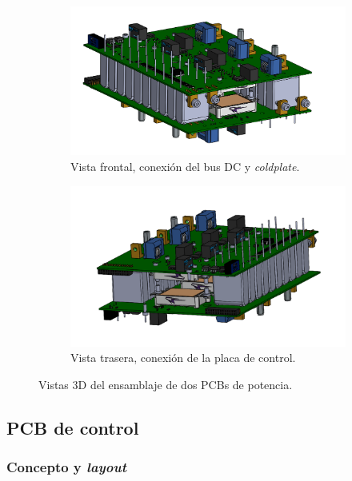 \begin{figure}[H]
	\centering
	\begin{subfigure}{0.45\linewidth}
		\centering
		\includegraphics[width=\linewidth]{fig/invPower3}
		\caption{Vista frontal, conexión del bus DC y \textit{coldplate}.}
	\end{subfigure}
	\hspace{0.05\linewidth} %
	\begin{subfigure}{0.45\linewidth}
		\centering
		\includegraphics[width=\linewidth]{fig/invPower4}
		\caption{Vista trasera, conexión de la placa de control.}
	\end{subfigure}
	\caption{Vistas 3D del ensamblaje de dos PCBs de potencia.}
	
\end{figure}


\subsection{PCB de control}

\subsubsection{Concepto y \textit{layout}}

